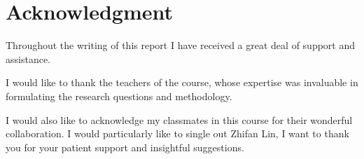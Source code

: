 \section*{Acknowledgment}

Throughout the writing of this report I have received a great deal of support and assistance.

I would like to thank the teachers of the course, whose expertise was invaluable in formulating the research questions and methodology. 

I would also like to acknowledge my classmates in this course for their wonderful collaboration. I would particularly like to single out Zhifan Lin, I want to thank you for your patient support and insightful suggestions.